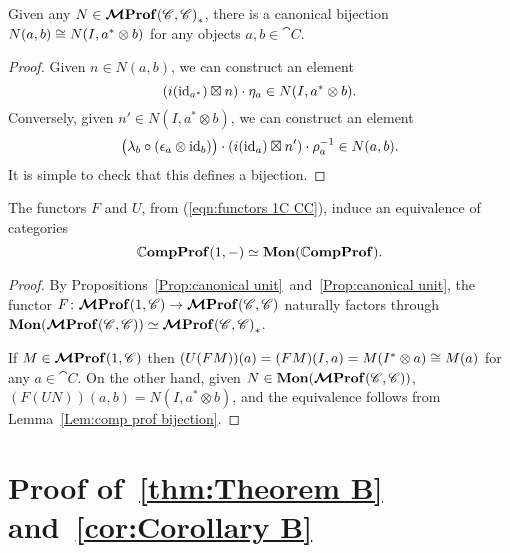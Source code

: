 \documentclass[12pt,oneside,article,draft]{memoir}
\begin{document}
\begin{lemma}\label{Lem:comp prof bijection}
   Given any $N\in\bm{\mathcal{M}}\mathbf{Prof}{(\mathscr{C},\mathscr{C})}_*$, there is a canonical bijection $N(a,b)\cong N(I,a^*\otimes b)$ for any objects $a,b\in\cat{C}$.
\end{lemma}
\begin{proof}
   Given $n\in N(a,b)$, we can construct an element
   \[
      (i(\operatorname{id}_{a^*})\boxtimes n)\cdot\eta_a \in N(I,a^*\otimes b).
   \]
   Conversely, given $n'\in N(I,a^*\otimes b)$, we can construct an element
   \[
      \bigl(\lambda_b\circ(\epsilon_a\otimes\operatorname{id}_b)\bigr)\cdot(i(\operatorname{id}_a)\boxtimes n')\cdot\rho_a^{-1} \in N(a,b).
   \]
   It is simple to check that this defines a bijection.
\end{proof}

\begin{proposition}\label{Prop:mon prof equivalence}
   The functors $F$ and $U$, from (\ref{eqn:functors 1C CC}), induce an equivalence of categories
   \[
      \mathbb{C}\mathbf{ompProf}(1,-)\simeq\mathbf{Mon}(\mathbb{C}\mathbf{ompProf}).
   \]
\end{proposition}
\begin{proof}
   By Propositions~\ref{Prop:canonical unit}~and~\ref{Prop:canonical unit}, the functor $F\colon\bm{\mathcal{M}}\mathbf{Prof}(1,\mathscr{C}) \to \bm{\mathcal{M}}\mathbf{Prof}(\mathscr{C},\mathscr{C})$ naturally factors through $\mathbf{Mon}(\bm{\mathcal{M}}\mathbf{Prof}(\mathscr{C},\mathscr{C}))\simeq\bm{\mathcal{M}}\mathbf{Prof}{(\mathscr{C},\mathscr{C})}_*$.

   If $M\in\bm{\mathcal{M}}\mathbf{Prof}(1,\mathscr{C})$ then $(U(FM))(a)=(FM)(I,a)=M(I^*\otimes a)\cong M(a)$ for any $a\in\cat{C}$.
   On the other hand, given $N\in\mathbf{Mon}(\bm{\mathcal{M}}\mathbf{Prof}(\mathscr{C},\mathscr{C}))$, $(F(UN))(a,b)=N(I,a^*\otimes b)$, and the equivalence follows from Lemma~\ref{Lem:comp prof bijection}.
\end{proof}

\section{Proof of~\ref{thm:Theorem B} and~\ref{cor:Corollary B}}\label{sec:proof of Bs}
\end{document}
